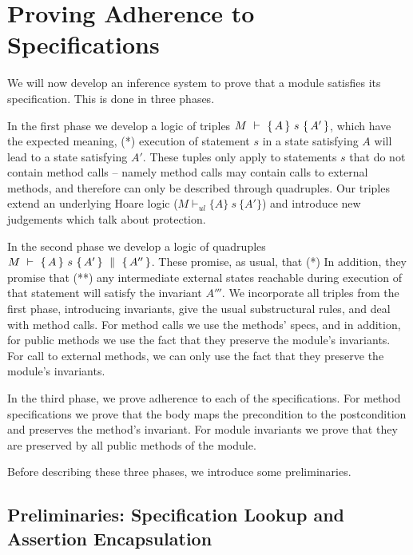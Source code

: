 
\section{Proving Adherence to \SpecLang Specifications}
\label{sect:proofSystem}

We will now develop an inference system to prove that a module %
satisfies its specification. This is done in three phases.


In the first phase we develop a logic of triples ${M\ \vdash\ \{\,A\, \} \ s\  \{\,A'\, \} }$, which have the expected meaning, \ie 
(*) execution of statement $s$ in a state satisfying $A$ will lead to a state satisfying $A'$.
These tuples only apply to statements $s$ that  do not contain method calls -- namely method calls may contain calls to external methods, and therefore can only be described through quadruples.
Our triples extend an underlying Hoare logic  (${M \vdash_{ul}  \{A\} {\ s\ } \{A'\} }$) and  introduce new judgements  which talk about protection.

In the second phase we develop a logic of quadruples ${M\ \vdash\ \{\,A\, \} \ s\  \{\,A'\, \}\, \,\parallel\,\, \{\, A'' \, \}}$. These promise, as usual, that (*) 
In addition, they promise that (**) any intermediate external states reachable during execution of that statement will satisfy the invariant  $A'''$.  
 We incorporate all triples from the first phase,       
introducing invariants, give the usual substructural rules, and deal with method calls. 
For method calls we use the methods' specs, and in addition, for public methods we use the fact that they preserve the module's invariants. 
For call to external  methods, we can only use the fact that they preserve the module's invariants. 
 
In the third phase, we prove adherence to each of the specifications. 
For method specifications we prove that the body maps the precondition to the postcondition and preserves the method's invariant. 
For module invariants we prove that they  are preserved by all public methods of the module.

\vspace{.1cm}
Before describing these three phases, we introduce some preliminaries.


\subsection{Preliminaries: Specification Lookup and  Assertion Encapsulation}

